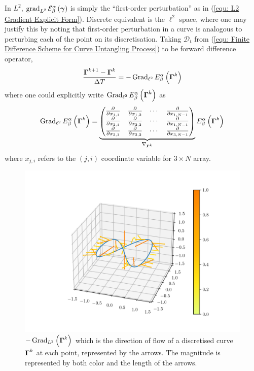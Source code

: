 \documentclass[../dissertation.tex]{subfiles}
\begin{document}
In $L^2$, $\operatorname{grad}_{L^2} \mathcal{E}_{\beta}^{\alpha} \left( \boldsymbol{\gamma} \right)$ is simply the ``first-order perturbation'' as in (\ref{equ: L2 Gradient Explicit Form}).
Discrete equivalent is the $\ell^2$ space,
where one may justify this by noting that first-order perturbation in a curve is analogous to perturbing each of the point on its discretisation.
Taking $\mathcal{D}_t$ from (\ref{equ: Finite Difference Scheme for Curve Untangling Process}) to be forward difference operator,
\begin{equation}
    \frac{\boldsymbol{\Gamma}^{k+1} - \boldsymbol{\Gamma}^k}{\Delta T} = - \operatorname{Grad}_{\ell^2} E_{\beta}^{\alpha} \left( \boldsymbol{\Gamma}^k \right)
    \label{equ: L2 Explicit Euler}
\end{equation}
where one could explicitly write $\operatorname{Grad}_{\ell^2} E_{\beta}^\alpha \left( \boldsymbol{\Gamma}^k \right)$ as
\begin{equation}
    \operatorname{Grad}_{\ell^2} E_{\beta}^\alpha \left( \boldsymbol{\Gamma}^k \right)
    =
    \underbrace{
        \begin{pmatrix}
            \frac{\partial}{\partial x_{1,1}} & \frac{\partial}{\partial x_{1,2}} & \cdots & \frac{\partial}{\partial x_{1,N-1}} \\
            \frac{\partial}{\partial x_{2,1}} & \frac{\partial}{\partial x_{2,2}} & \cdots & \frac{\partial}{\partial x_{1,N-1}} \\
            \frac{\partial}{\partial x_{3,1}} & \frac{\partial}{\partial x_{3,2}} & \cdots & \frac{\partial}{\partial x_{3,N-1}}
        \end{pmatrix}
    }_{\nabla_{\boldsymbol{\Gamma}^k}}
    E_{\beta}^{\alpha} \left( \boldsymbol{\Gamma}^k \right)
    \label{equ: Gradient in l2}
\end{equation}
where $x_{j,i}$ refers to the $\left( j,i \right)$ coordinate variable for $3 \times N$ array.
\begin{figure}[tbp]
    \centering
    \includegraphics[width=\textwidth]{sections/unknottingCurveImgs/L2Derivative}
    \caption{$-\operatorname{Grad}_{L^2} \left( \boldsymbol{\Gamma}^k \right)$ which is the direction of flow of a discretised curve $\boldsymbol{\Gamma}^k$ at each point, represented by the arrows. The magnitude is represented by both color and the length of the arrows.}
    \label{fig: L2Derivative}
\end{figure}
\end{document}

